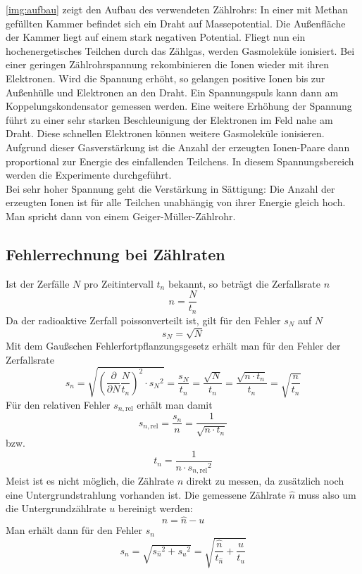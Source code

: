 \autoref{img:aufbau} zeigt den Aufbau des verwendeten Zählrohrs:
In einer mit Methan gefüllten Kammer befindet sich ein Draht auf Massepotential. Die Außenfläche der Kammer liegt auf einem
stark negativen Potential. Fliegt nun ein hochenergetisches Teilchen durch das Zählgas, werden Gasmoleküle ionisiert.
Bei einer geringen Zählrohrspannung rekombinieren die Ionen wieder mit ihren Elektronen.
Wird die Spannung erhöht, so gelangen positive Ionen bis zur Außenhülle und Elektronen an den Draht.
Ein Spannungspuls kann dann am Koppelungskondensator gemessen werden.
Eine weitere Erhöhung der Spannung führt zu einer sehr starken Beschleunigung der Elektronen im Feld nahe am Draht.
Diese schnellen Elektronen können weitere Gasmoleküle ionisieren. Aufgrund dieser Gasverstärkung
ist die Anzahl der erzeugten Ionen-Paare dann proportional zur Energie des einfallenden Teilchens.
In diesem Spannungsbereich werden die Experimente durchgeführt.\\
Bei sehr hoher Spannung geht die Verstärkung in Sättigung: Die Anzahl der erzeugten Ionen ist
für alle Teilchen unabhängig von ihrer Energie gleich hoch. Man spricht dann von einem Geiger-Müller-Zählrohr.


\subsection{Fehlerrechnung bei Zählraten}

Ist der Zerfälle $N$ pro Zeitintervall $t_n$ bekannt, so
beträgt die Zerfallsrate $n$
\begin{equation}
	n=\frac{N}{t_n}
\end{equation}
Da der radioaktive Zerfall poissonverteilt ist, gilt für den Fehler $s_N$ auf $N$
\begin{equation}
	s_N=\sqrt{N}
\end{equation}
Mit dem Gaußschen Fehlerfortpflanzungsgesetz erhält man für den Fehler der Zerfallsrate
\begin{equation}
	s_{n}=
	\sqrt{\left(\frac{\partial }{\partial N}\frac{N}{t_n}\right)^2 \cdot s_N{}^2}=
	\frac{s_N}{t_n}=
	\frac{\sqrt{N}}{t_n}=
	\frac{\sqrt{n \cdot t_n}}{t_n}=
	\sqrt{\frac{n}{t_n}}
\end{equation}
Für den relativen Fehler $s_{n,\text{rel}}$ erhält man damit
\begin{equation}
	s_{n,\text{rel}}=\frac{s_{n}}{n}=
	\frac{1}{\sqrt{n \cdot t_n}}
\end{equation}
bzw.
\begin{equation}
\label{eq:messzeit}
	t_n=
	\frac{1}{n \cdot s_{n,\text{rel}}{}^2}
\end{equation}
Meist ist es nicht möglich, die Zählrate $n$ direkt zu messen, da zusätzlich noch eine Untergrundstrahlung
vorhanden ist. Die gemessene Zählrate $\hat{n}$ muss also um die Untergrundzählrate $u$ bereinigt werden:
\begin{equation}
   n = \hat{n} - u
\end{equation}
Man erhält dann für den Fehler $s_n$
\begin{equation}
\label{eq:counts:errors}
  s_n=\sqrt{s_{\hat{n}}{}^2+s_u{}^2}=\sqrt{\frac{\hat{n}}{t_{\hat{n}}}+\frac{u}{t_u}}
\end{equation}
